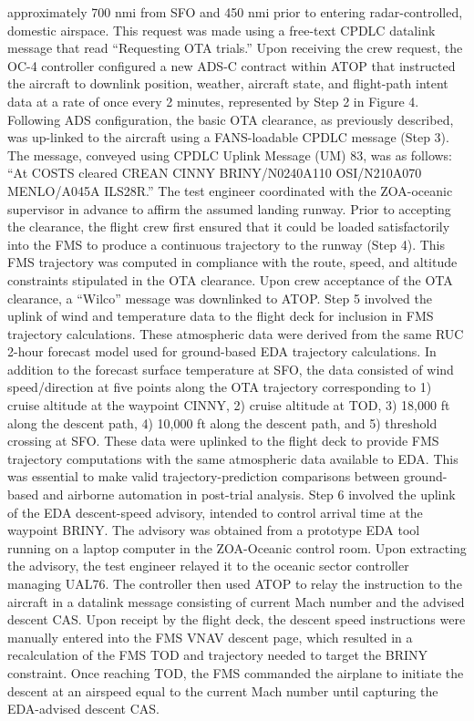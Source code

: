 \documentclass{aer1315-pretty}
\begin{document}
\begin{itemize}
approximately 700 nmi from SFO and 450 nmi prior to entering radar-controlled, domestic airspace. This request
was made using a free-text CPDLC datalink message that read “Requesting OTA trials.” Upon receiving the crew
request, the OC-4 controller configured a new ADS-C contract within ATOP that instructed the aircraft to downlink
position, weather, aircraft state, and flight-path intent data at a rate of once every 2 minutes, represented by Step 2 in
Figure 4.
    Following ADS configuration, the basic OTA clearance, as previously described, was up-linked to the aircraft
using a FANS-loadable CPDLC message (Step 3). The message, conveyed using CPDLC Uplink Message (UM) 83,
was as follows: “At COSTS cleared CREAN CINNY BRINY/N0240A110 OSI/N210A070 MENLO/A045A
ILS28R.” The test engineer coordinated with the ZOA-oceanic supervisor in advance to affirm the assumed landing
runway. Prior to accepting the clearance, the flight crew first ensured that it could be loaded satisfactorily into the
FMS to produce a continuous trajectory to the runway (Step 4). This FMS trajectory was computed in compliance
with the route, speed, and altitude constraints stipulated in the OTA clearance. Upon crew acceptance of the OTA
clearance, a “Wilco” message was downlinked to ATOP.
    Step 5 involved the uplink of wind and temperature data to the flight deck for inclusion in FMS trajectory
calculations. These atmospheric data were derived from the same RUC 2-hour forecast model used for ground-based
EDA trajectory calculations. In addition to the forecast surface temperature at SFO, the data consisted of wind
speed/direction at five points along the OTA trajectory corresponding to 1) cruise altitude at the waypoint CINNY,
2) cruise altitude at TOD, 3) 18,000 ft along the descent path, 4) 10,000 ft along the descent path, and 5) threshold
crossing at SFO. These data were uplinked to the flight deck to provide FMS trajectory computations with the same
atmospheric data available to EDA. This was essential to make valid trajectory-prediction comparisons between
ground-based and airborne automation in post-trial analysis.
    Step 6 involved the uplink of the EDA descent-speed advisory, intended to control arrival time at the waypoint
BRINY. The advisory was obtained from a prototype EDA tool running on a laptop computer in the ZOA-Oceanic
control room. Upon extracting the advisory, the test engineer relayed it to the oceanic sector controller managing
UAL76. The controller then used ATOP to relay the instruction to the aircraft in a datalink message consisting of
current Mach number and the advised descent CAS. Upon receipt by the flight deck, the descent speed instructions
were manually entered into the FMS VNAV descent page, which resulted in a recalculation of the FMS TOD and
trajectory needed to target the BRINY constraint. Once reaching TOD, the FMS commanded the airplane to initiate
the descent at an airspeed equal to the current Mach number until capturing the EDA-advised descent CAS.




\end{itemize}
\end{document}
